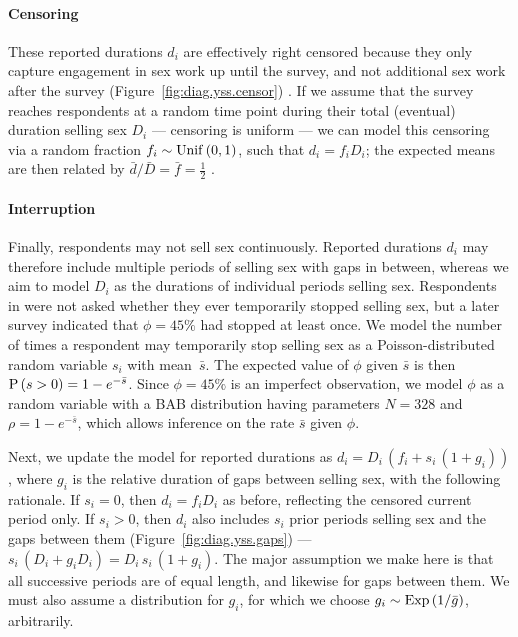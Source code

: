 \paragraph{Censoring}
These reported durations $d_i$ are effectively right censored
because they only capture engagement in sex work up until the survey,
and not additional sex work after the survey
(Figure~\ref{fig:diag.yss.censor}) \cite{Fazito2012}.
If we assume that the survey reaches respondents at a random time point
during their total (eventual) duration selling sex $D_i$
--- \ie censoring is uniform --- we can model this censoring via
a random fraction $f_i \sim \mathrm{Unif}\,(0,1)$, such that $d_i = f_i D_i$;
the expected means are then related by $\bar{d} / \bar{D} = \bar{f} = \frac12$ \cite{Tufto2017}.
\paragraph{Interruption}
Finally, respondents may not sell sex continuously.
Reported durations $d_i$ may therefore include
multiple periods of selling sex with gaps in between,
whereas we aim to model $D_i$ as the durations of individual periods selling sex.
Respondents in \cite{Baral2014} were not asked whether they ever temporarily stopped selling sex,
but a later survey \cite{EswKP2014} indicated that $\phi = 45\%$ had stopped at least once.
We model the number of times a respondent may temporarily stop selling sex as
a Poisson-distributed random variable $s_i$ with mean~$\bar{s}$.
The expected value of $\phi$ given $\bar{s}$ is then $\mathrm{P}\,(s > 0) = 1 - e^{-\bar{s}}$.
Since $\phi = 45\%$ is an imperfect observation,
we model $\phi$ as a random variable with a BAB distribution
having parameters $N = 328$ and $\rho = 1 - e^{-\bar{s}}$,
which allows inference on the rate $\bar{s}$ given $\phi$.
\par
Next, we update the model for reported durations as $d_i = D_i\,(f_i + s_i\,(1 + g_i))$,
where $g_i$ is the relative duration of gaps between selling sex,
with the following rationale.
If $s_i = 0$, then $d_i = f_i D_i$ as before, reflecting the censored current period only.
If $s_i > 0$, then $d_i$ also includes $s_i$ prior periods selling sex and the gaps between them
(Figure~\ref{fig:diag.yss.gaps}) --- \ie $s_i\,(D_i + g_i D_i) = D_i\,s_i\,(1 + g_i)$.
The major assumption we make here is that
all successive periods are of equal length, and likewise for gaps between them.
We must also assume a distribution for $g_i$, for which we choose
$g_i \sim \mathrm{Exp}\,(1/\bar{g})$, arbitrarily.
